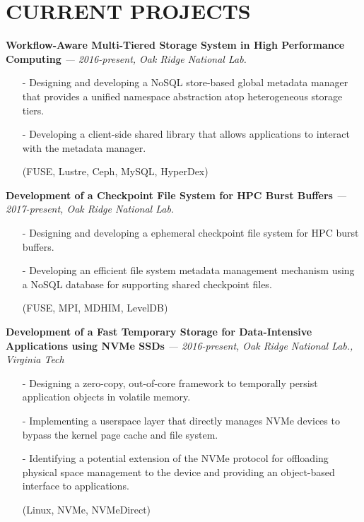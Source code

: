 \section{CURRENT PROJECTS}
\vspace{.03in}
  {\bf Workflow-Aware Multi-Tiered Storage System in High Performance Computing}
   {\it \footnotesize --- 2016-present, Oak Ridge National Lab.}
   \begin{itemize}[leftmargin=*]
    \setlength\itemsep{-0.02in}
    \item[-] Designing and developing a NoSQL store-based global metadata manager
	     that provides a unified namespace abstraction atop heterogeneous
	     storage tiers.
    \item[-] Developing a client-side shared library that allows applications to interact
             with the metadata manager.
    \item[] {\small(FUSE, Lustre, Ceph, MySQL, HyperDex)}
   \end{itemize}
  \vspace{-0.15in}
  {\bf Development of a Checkpoint File System for HPC Burst Buffers}
   {\it \footnotesize --- 2017-present, Oak Ridge National Lab.}
   \begin{itemize}[leftmargin=*]
    \setlength\itemsep{-0.02in}
    \item[-] Designing and developing a ephemeral checkpoint file system for HPC burst buffers.
    \item[-] Developing an efficient file system metadata management mechanism
             using a NoSQL database for supporting shared checkpoint files.
    \item[] {\small(FUSE, MPI, MDHIM, LevelDB)}
   \end{itemize}
  \vspace{-0.15in}
  {\bf Development of a Fast Temporary Storage for Data-Intensive Applications using NVMe SSDs}
   {\it \footnotesize --- 2016-present, Oak Ridge National Lab., Virginia Tech}
   \begin{itemize}[leftmargin=*]
    \setlength\itemsep{-0.02in}
    \item[-] Designing a zero-copy, out-of-core framework to temporally persist
             application objects in volatile memory.
    \item[-] Implementing a userspace layer that directly manages NVMe
             devices to bypass the kernel page cache and file system.
    \item[-] Identifying a potential extension of the NVMe protocol 
             for offloading physical space management to the device and
             providing an object-based interface to applications.
    \item[] {\small(Linux, NVMe, NVMeDirect)}
   \end{itemize}
 

